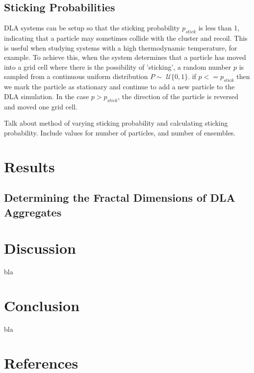 \documentclass[11pt]{iopart}
\begin{document}
\subsection{Sticking Probabilities}

DLA systems can be setup so that the sticking probability $p_{stick}$ is less than 1, indicating that a particle may sometimes collide with the cluster and recoil. This is useful when studying systems with a high thermodynamic temperature, for example. To achieve this, when the system determines that a particle has moved into a grid cell where there is the possibility of 'sticking', a random number $p$ is sampled from a continuous uniform distribution $P \sim$ $\mathcal{U}\{0, 1\}$. if $p <= p_{stick}$ then we mark the particle as stationary and continue to add a new particle to the DLA simulation. In the case $p > p_{stick}$, the direction of the particle is reversed and moved one grid cell. 

Talk about method of varying sticking probability and calculating sticking probability. Include values for number of particles, and number of ensembles.

\section{Results}

\subsection{Determining the Fractal Dimensions of DLA Aggregates}



\section{Discussion}
bla

\section{Conclusion}
bla

\section*{References}


\end{document}

